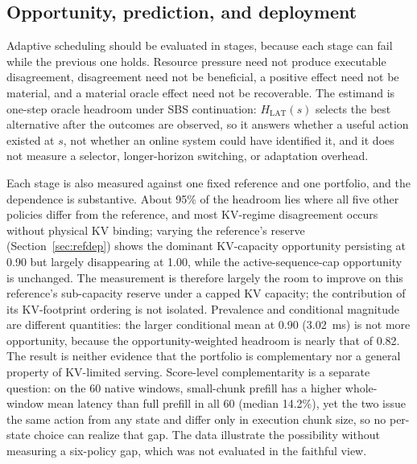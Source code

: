 \documentclass[preprint,12pt]{elsarticle}
\begin{document}
\subsection{Opportunity, prediction, and deployment}
Adaptive scheduling should be evaluated in stages, because each stage can fail
while the previous one holds. Resource pressure need not produce executable
disagreement, disagreement need not be beneficial, a positive effect need not be
material, and a material oracle effect need not be recoverable.
The estimand is one-step oracle headroom under SBS continuation:
$H_{\mathrm{LAT}}(s)$ selects the best alternative after the outcomes are
observed, so it answers whether a useful action existed at $s$, not whether an
online system could have identified it, and it does not measure a selector,
longer-horizon switching, or adaptation overhead.

Each stage is also measured against one fixed reference and one portfolio, and
the dependence is substantive. About 95\% of the headroom lies where all five
other policies differ from the reference, and most KV-regime disagreement occurs
without physical KV binding; varying the reference's reserve
(Section~\ref{sec:refdep}) shows the dominant KV-capacity opportunity persisting
at 0.90 but largely disappearing at 1.00, while the active-sequence-cap
opportunity is unchanged. The measurement is therefore largely the room to
improve on this reference's sub-capacity reserve under a capped KV capacity; the
contribution of its KV-footprint ordering is not isolated. Prevalence and
conditional magnitude are different quantities: the larger conditional mean at
0.90 (3.02~ms) is not more opportunity, because the opportunity-weighted headroom
is nearly that of 0.82. The result is neither
evidence that the portfolio is complementary nor a general property of
KV-limited serving. Score-level complementarity is a separate question: on
the 60 native windows, small-chunk prefill has a higher whole-window mean
latency than full prefill in all 60 (median 14.2\%), yet the two issue the same
action from any state and differ only in execution chunk size, so no per-state
choice can realize that gap. The data illustrate the possibility without
measuring a six-policy gap, which was not evaluated in the faithful view.
\end{document}
